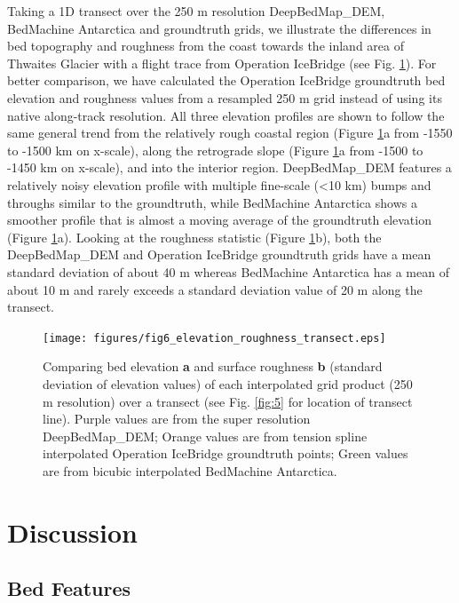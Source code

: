 \documentclass[tc, manuscript]{copernicus}
\begin{document}
Taking a 1D transect over the 250 m resolution DeepBedMap\_DEM, BedMachine Antarctica and groundtruth grids, we illustrate the differences in bed topography and roughness from the coast towards the inland area of Thwaites Glacier with a flight trace from Operation IceBridge (see Fig. \ref{fig:6}).
For better comparison, we have calculated the Operation IceBridge groundtruth bed elevation and roughness values from a resampled 250 m grid instead of using its native along-track resolution.
All three elevation profiles are shown to follow the same general trend from the relatively rough coastal region (Figure \ref{fig:6}a from -1550 to -1500 km on x-scale), along the retrograde slope (Figure \ref{fig:6}a from -1500 to -1450 km on x-scale), and into the interior region.
DeepBedMap\_DEM features a relatively noisy elevation profile with multiple fine-scale (<10 km) bumps and throughs similar to the groundtruth, while BedMachine Antarctica shows a smoother profile that is almost a moving average of the groundtruth elevation (Figure \ref{fig:6}a).
Looking at the roughness statistic (Figure \ref{fig:6}b), both the DeepBedMap\_DEM and Operation IceBridge groundtruth grids have a mean standard deviation of about 40 m whereas BedMachine Antarctica has a mean of about 10 m and rarely exceeds a standard deviation value of 20 m along the transect.

\begin{figure}[htbp]
  \texttt{[image: figures/fig6\_elevation\_roughness\_transect.eps]}
  \caption{
    Comparing bed elevation \textbf{a} and surface roughness \textbf{b} (standard deviation of elevation values) of each interpolated grid product (250 m resolution) over a transect (see Fig. \ref{fig:5} for location of transect line).
    Purple values are from the super resolution DeepBedMap\_DEM;
    Orange values are from tension spline interpolated Operation IceBridge groundtruth points;
    Green values are from bicubic interpolated BedMachine Antarctica.
  }
  \label{fig:6}
\end{figure}


\section{Discussion}

\subsection{Bed Features}
\end{document}
